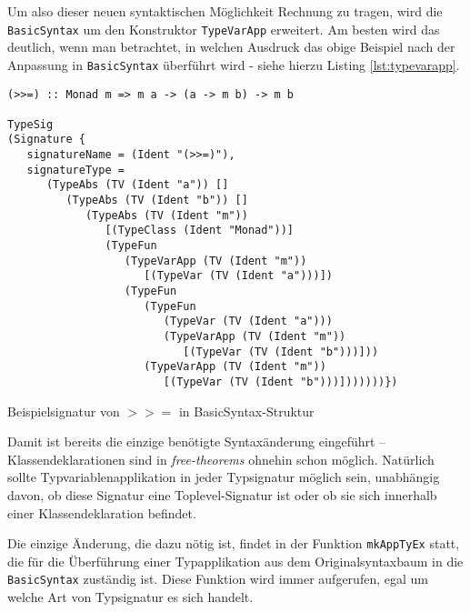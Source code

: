 
Um also dieser neuen syntaktischen Möglichkeit Rechnung zu tragen, wird die \texttt{BasicSyntax} um den Konstruktor
\texttt{TypeVarApp} erweitert. Am besten wird das deutlich, wenn man betrachtet, in welchen Ausdruck das obige Beispiel
nach der Anpassung in \texttt{BasicSyntax} überführt wird - siehe hierzu Listing \ref{lst:typevarapp}.

\begin{listing}[ht]
\begin{verbatim}
(>>=) :: Monad m => m a -> (a -> m b) -> m b

TypeSig
(Signature {
   signatureName = (Ident "(>>=)"),
   signatureType =
      (TypeAbs (TV (Ident "a")) []
         (TypeAbs (TV (Ident "b")) []
            (TypeAbs (TV (Ident "m"))
               [(TypeClass (Ident "Monad"))]
               (TypeFun
                  (TypeVarApp (TV (Ident "m"))
                     [(TypeVar (TV (Ident "a")))])
                  (TypeFun
                     (TypeFun
                        (TypeVar (TV (Ident "a")))
                        (TypeVarApp (TV (Ident "m"))
                           [(TypeVar (TV (Ident "b")))]))
                     (TypeVarApp (TV (Ident "m"))
                        [(TypeVar (TV (Ident "b")))]))))))})
\end{verbatim}
\caption{Beispielsignatur von $>>=$ in BasicSyntax-Struktur}
\label{lst:typevarapp}
\end{listing}

Damit ist bereits die einzige benötigte Syntaxänderung eingeführt -- Klassendeklarationen sind in \textit{free-theorems}
ohnehin schon möglich. Natürlich sollte Typvariablenapplikation in jeder Typsignatur möglich sein, unabhängig davon, ob diese
Signatur eine Toplevel-Signatur ist oder ob sie sich innerhalb einer Klassendeklaration befindet.

Die einzige Änderung, die dazu nötig ist, findet in der Funktion \texttt{mkAppTyEx} statt, die für die Überführung einer
Typapplikation aus dem Originalsyntaxbaum in die \texttt{BasicSyntax} zuständig ist. Diese Funktion wird immer aufgerufen,
egal um welche Art von Typsignatur es sich handelt.

